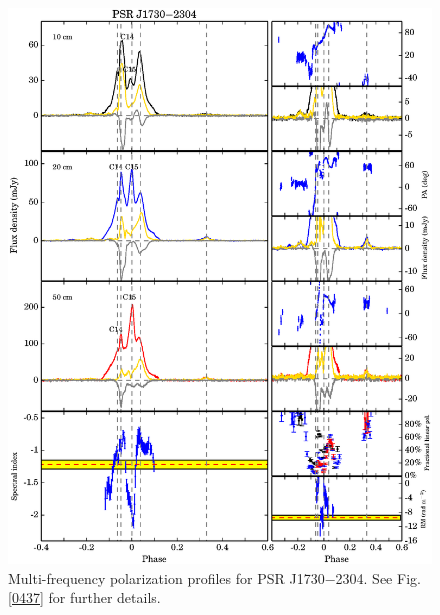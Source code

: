 \documentclass[useAMS,usenatbib]{mn2e}
\begin{document}
\begin{appendices}
\begin{figure}
\begin{center}
\includegraphics[width=6 in]{1730.ps}
\caption{Multi-frequency polarization profiles for PSR J1730$-$2304. 
See Fig. \ref{0437} for further details.}
\label{1730}
\end{center}
\end{figure}


\end{appendices}
\end{document}

